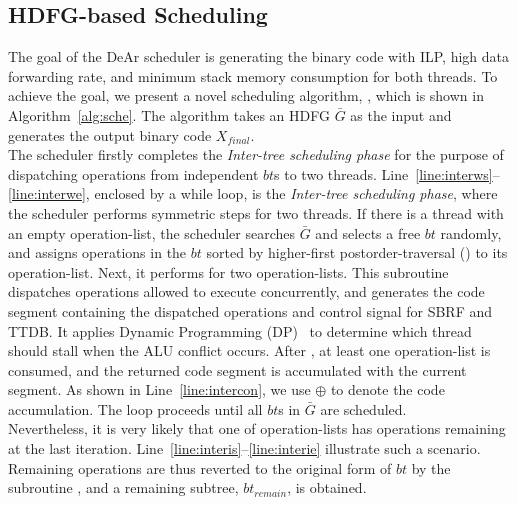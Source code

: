 \subsection{HDFG-based Scheduling}
\label{sec:scheduling}
The goal of the DeAr scheduler is generating the binary code with ILP, high data forwarding rate, 
and minimum stack memory consumption for both threads.
To achieve the goal, we present a novel scheduling algorithm, 
, which is shown in Algorithm~\ref{alg:sche}.
The algorithm takes an HDFG $\bar{G}$ as the input and generates the output binary code $X_{final}$.
\\\indent
The scheduler firstly completes the \textit{Inter-tree scheduling phase}
for the purpose of dispatching operations from independent $bt$s to two threads.
Line~\ref{line:interws}--\ref{line:interwe}, enclosed by a while loop, is the \textit{Inter-tree scheduling phase}, 
where the scheduler performs symmetric steps for two threads.
If there is a thread with an empty operation-list, 
the scheduler searches $\bar{G}$ and selects a free $bt$ randomly, 
and assigns operations in the $bt$ sorted by higher-first postorder-traversal () to its operation-list.
Next, it performs  for two operation-lists.
This subroutine dispatches operations allowed to execute concurrently, 
and generates the code segment containing the dispatched operations and control signal for SBRF and TTDB.
It applies Dynamic Programming (DP)~\cite{dp} to determine which thread should stall when the ALU conflict occurs.
After , at least one operation-list is consumed, 
and the returned code segment is accumulated with the current segment.
As shown in Line~\ref{line:intercon}, we use $\oplus$ to denote the code accumulation.
The loop proceeds until all $bt$s in $\bar{G}$ are scheduled.
\\\indent
Nevertheless, it is very likely that one of operation-lists has operations remaining at the last iteration.
Line~\ref{line:interis}--\ref{line:interie} illustrate such a scenario.
Remaining operations are thus reverted to the original form of $bt$ by the subroutine ,
and a remaining subtree, $bt_{remain}$, is obtained.%
\\\indent
